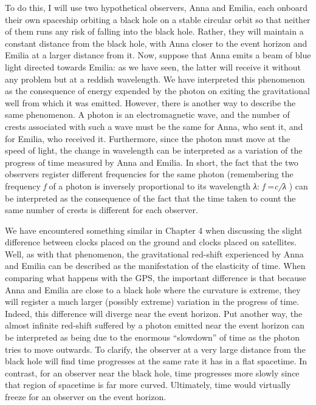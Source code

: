 To do this, I will use two hypothetical observers, Anna and Emilia, each onboard their
own spaceship orbiting a black hole on a stable circular orbit so that
neither of them runs any risk of falling into the black hole. Rather, they will maintain
a constant distance from the black hole, with Anna closer to the event horizon and
Emilia at a larger distance from it. Now, suppose that Anna emits a beam of blue light
directed towards Emilia: as we have seen, the latter will receive it without any problem
but at a reddish wavelength. We have interpreted this phenomenon as the consequence of
energy expended by the photon on exiting the gravitational well from which it was
emitted. However, there is another way to describe the same phenomenon. A photon is an
electromagnetic wave, and the number of crests associated with such a wave must be the
same for Anna, who sent it, and for Emilia, who received it. Furthermore, since the
photon must move at the speed of light, the change in wavelength can be interpreted as a
variation of the progress of time measured by Anna and Emilia. In short, the fact that
the two observers register different frequencies for the same photon
(remembering the frequency \emph{f} of a photon is inversely proportional to its
wavelength \emph{λ}: \emph{f} =\emph{c/λ} ) can be interpreted as the consequence of the
fact that the time taken to count the same number of crests is different for each
observer.

We have encountered something similar in Chapter 4 when discussing the slight difference
between clocks placed on the ground and clocks placed on satellites. Well, as with that
phenomenon, the gravitational red-shift experienced by Anna and Emilia
can be described as the manifestation of the elasticity of time. When comparing what
happens with the GPS, the important difference is that because Anna and Emilia are close
to a black hole where the curvature is extreme, they will register a much larger
(possibly extreme) variation in the progress of time. Indeed, this difference will
diverge near the event horizon. Put another way, the almost infinite red-shift suffered
by a photon emitted near the event horizon can be interpreted as being due to the
enormous ``slowdown'' of time as the photon tries to move outwards. To
clarify, the observer at a very large distance from the black hole will find time
progresses at the same rate it has in a flat spacetime. In contrast, for an observer
near the black hole, time progresses more slowly since that region of spacetime is far
more curved. Ultimately, time would virtually freeze for an observer on the event
horizon.

